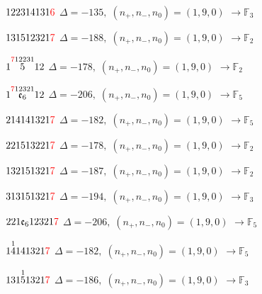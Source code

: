 \documentclass[10pt]{article}
\begin{document}
$122314131\textcolor{red}{6}$ \quad $\Delta=-135,\; (n_+,n_-,n_0)=(1,9,0)$ \quad $\to \mathbb{F}_{3}$

\smallskip

$131512321\textcolor{red}{7}$ \quad $\Delta=-188,\; (n_+,n_-,n_0)=(1,9,0)$ \quad $\to \mathbb{F}_{2}$

\smallskip

$1\overset{\textcolor{red}{7}12231}{5}12$ \quad $\Delta=-178,\; (n_+,n_-,n_0)=(1,9,0)$ \quad $\to \mathbb{F}_{2}$

\smallskip

$1\overset{\textcolor{red}{7}12321}{\mathfrak{e}_6}12$ \quad $\Delta=-206,\; (n_+,n_-,n_0)=(1,9,0)$ \quad $\to \mathbb{F}_{5}$

\smallskip

$214141321\textcolor{red}{7}$ \quad $\Delta=-182,\; (n_+,n_-,n_0)=(1,9,0)$ \quad $\to \mathbb{F}_{5}$

\smallskip

$221513221\textcolor{red}{7}$ \quad $\Delta=-178,\; (n_+,n_-,n_0)=(1,9,0)$ \quad $\to \mathbb{F}_{2}$

\smallskip

$132151321\textcolor{red}{7}$ \quad $\Delta=-187,\; (n_+,n_-,n_0)=(1,9,0)$ \quad $\to \mathbb{F}_{2}$

\smallskip

$313151321\textcolor{red}{7}$ \quad $\Delta=-194,\; (n_+,n_-,n_0)=(1,9,0)$ \quad $\to \mathbb{F}_{3}$

\smallskip

$221\mathfrak{e}_612321\textcolor{red}{7}$ \quad $\Delta=-206,\; (n_+,n_-,n_0)=(1,9,0)$ \quad $\to \mathbb{F}_{5}$

\smallskip

$1\overset{1}{4}141321\textcolor{red}{7}$ \quad $\Delta=-182,\; (n_+,n_-,n_0)=(1,9,0)$ \quad $\to \mathbb{F}_{5}$

\smallskip

$131\overset{1}{5}1321\textcolor{red}{7}$ \quad $\Delta=-186,\; (n_+,n_-,n_0)=(1,9,0)$ \quad $\to \mathbb{F}_{3}$
\end{document}
